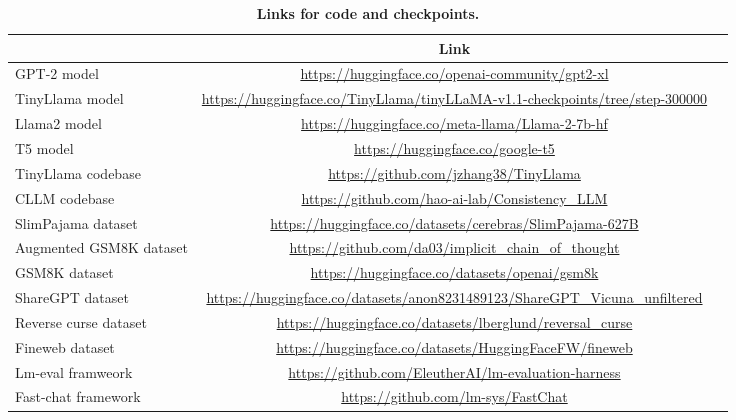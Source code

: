 \documentclass{article} %
\begin{document}
\begin{table}[t!]
    \centering
    \caption{\textbf{Links for code and checkpoints.}  }
    \label{tab:links}
    \begin{adjustbox}{max width=\textwidth}
    \begin{tabular}{lcc}
        \toprule
         & Link  \\
         \midrule
         GPT-2 model & \url{https://huggingface.co/openai-community/gpt2-xl} \\
         \midrule
         TinyLlama model & \url{https://huggingface.co/TinyLlama/tinyLLaMA-v1.1-checkpoints/tree/step-300000} \\
         \midrule
         Llama2 model & \url{https://huggingface.co/meta-llama/Llama-2-7b-hf} \\
         \midrule
         T5 model & \url{https://huggingface.co/google-t5} \\
         \midrule
         TinyLlama codebase & \url{https://github.com/jzhang38/TinyLlama} \\
         \midrule
         CLLM codebase & \url{https://github.com/hao-ai-lab/Consistency_LLM} \\
         \midrule
         SlimPajama dataset & \url{https://huggingface.co/datasets/cerebras/SlimPajama-627B} \\
         \midrule
         Augmented GSM8K dataset & \url{https://github.com/da03/implicit_chain_of_thought} \\
         \midrule
         GSM8K dataset & \url{https://huggingface.co/datasets/openai/gsm8k} \\
         \midrule
         ShareGPT dataset& \url{https://huggingface.co/datasets/anon8231489123/ShareGPT_Vicuna_unfiltered}  \\
         \midrule
         Reverse curse dataset & \url{https://huggingface.co/datasets/lberglund/reversal_curse} \\
         \midrule
         Fineweb dataset & \url{https://huggingface.co/datasets/HuggingFaceFW/fineweb} \\
         \midrule
         Lm-eval framweork& \url{https://github.com/EleutherAI/lm-evaluation-harness} \\
         \midrule
         Fast-chat framework & \url{https://github.com/lm-sys/FastChat} \\
        \bottomrule
    \end{tabular}
    \end{adjustbox}
\end{table}
\end{document}
